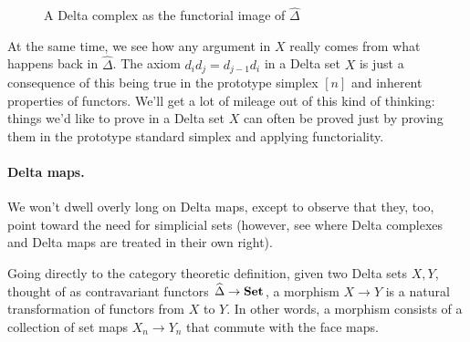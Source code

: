 \documentclass[12pt]{article}
\theoremstyle{plain}
\theoremstyle{definition}
\theoremstyle{remark}
\newcommand{\Set}{\text{\textbf{Set}}}
\begin{document}
\begin{figure}[!htp]
\begin{center}
\end{center}
\caption{A Delta complex as the functorial image of $\widehat \Delta$}\label{F: fig8}
\end{figure}

At the same time, we see how any argument in $X$ really comes from what happens back in $\widehat \Delta$. The axiom $d_id_j=d_{j-1}d_i$ in a Delta set $X$ is just a consequence of this being true in the prototype simplex $[n]$ and inherent properties of functors. We'll get a lot of mileage  out of this kind of thinking: things we'd like to prove in a Delta set $X$ can often be proved just by proving them in the prototype standard simplex and applying functoriality.


\paragraph{Delta maps.}

We won't dwell overly long on Delta maps, except to observe that they, too, point toward the need for simplicial sets (however, see \cite{RSDelta} where Delta complexes and Delta maps are treated in their own right).

Going directly to the category theoretic definition, given two Delta sets $X,Y$, thought of as contravariant functors $\widehat \Delta\to \Set$, a morphism $X\to Y$ is a natural transformation of functors from $X$ to $Y$. In other words, a morphism consists of a collection of set maps $X_n\to Y_n$ that commute with the face maps. 
\end{document}
